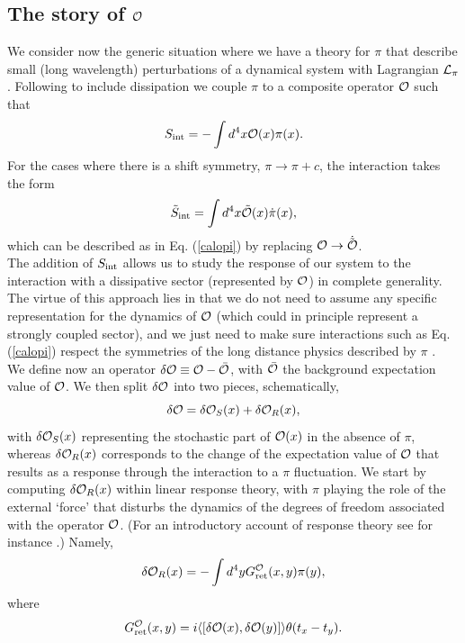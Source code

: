 \documentclass[11pt,amsmath,floats,floatfix,nofootinbib,secnumarabic, superscriptaddress, tightenlines]{revtex4}
\newcommand{\beq}{\begin{equation}}
\newcommand{\eeq}{\end{equation}}
\newcommand{\calo}{{\cal O}}
\begin{document}
\subsection{The story of $\cal O$}\label{storyo}

 We consider now the generic situation where we have a theory for $\pi$ that describe small (long wavelength) perturbations of a dynamical system with Lagrangian ${\cal L}_\pi$. Following \cite{dis1,dis2} to include dissipation we couple $\pi$ to a composite operator $\cal O$ such that
\beq
\label{calopi}
S_{\rm int} =- \int d^4x \calo(x)\pi(x).
\eeq
For the cases where there is a shift symmetry, $\pi \to \pi +c$, the interaction takes the form
\beq
\label{tcalop}
\tilde S_{\rm int} =\int d^4 x \tilde\calo(x)\dot\pi(x),
\eeq
which can be described as in Eq. (\ref{calopi}) by replacing $\calo \to \dot{\tilde\calo}$.\\

The addition of $S_{\rm int}$ allows us to study the response of our system to the interaction with a dissipative sector (represented by $\calo$)
 in complete generality. The virtue of this approach lies in that we do not need to assume any specific representation for the dynamics of $\calo$ (which could in principle represent a strongly coupled sector), and we just need to make sure interactions such as Eq. (\ref{calopi}) respect the symmetries of the long distance physics described by  $\pi$  \cite{dis1,dis2}.\\
 
 We define now an operator $\delta\calo\equiv \calo-\bar\calo$, with $\bar\calo$ the background expectation value of $\calo$. We then split $\delta\calo$ into two pieces, schematically, 
\beq
\delta\calo = \delta\calo_S(x) + \delta\calo_R(x),
\eeq
with $\delta\calo_S(x)$ representing the stochastic part of $\calo(x)$ in the absence of $\pi$,
whereas $\delta\calo_R(x)$  corresponds to the change of the expectation value of $\calo$ that results as a response through the interaction to a $\pi$ fluctuation. We start by computing $\delta\calo_R(x)$ within linear response theory, with $\pi$ playing the role of  the external `force' that disturbs the dynamics of the degrees of freedom associated with the operator $\calo$. (For an introductory account of response theory see for
instance \cite{Fetter}.) Namely,
\beq
\label{dret0}
\delta\calo_R(x) =  -\int d^4y G_{\rm ret}^\calo(x,y)\pi(y),
\eeq
where
\beq
\label{dret}
G_{\rm ret}^\calo(x,y) = i\langle[\delta\calo(x),\delta\calo(y)]\rangle \theta(t_x-t_y).
\eeq
\end{document}
